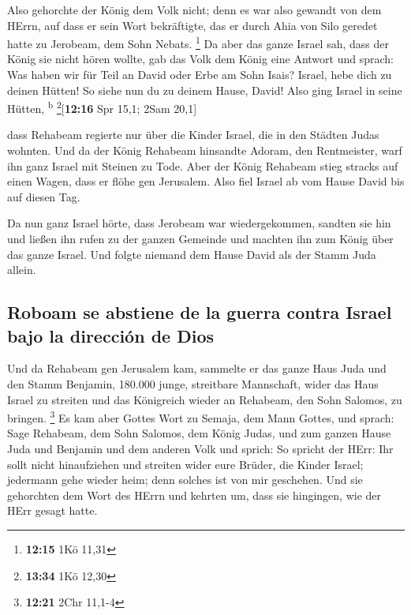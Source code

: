  Also gehorchte der König dem Volk nicht; denn es war
also gewandt von dem HErrn, auf dass er sein Wort bekräftigte, das er
durch Ahia von Silo geredet hatte zu Jerobeam, dem Sohn Nebats.
\footnote{\textbf{12:15} 1Kö 11,31}  Da aber das ganze
Israel sah, dass der König sie nicht hören wollte, gab das Volk dem
König eine Antwort und sprach: Was haben wir für Teil an David oder Erbe
am Sohn Isais? Israel, hebe dich zu deinen Hütten! So siehe nun du zu
deinem Hause, David! Also ging Israel in seine Hütten,
\textsuperscript{b} \footnote{\textbf{13:34} 1Kö 12,30}{[}\textbf{12:16}
Spr 15,1; 2Sam 20,1{]}

 dass Rehabeam regierte nur über die Kinder Israel, die
in den Städten Judas wohnten.  Und da der König Rehabeam
hinsandte Adoram, den Rentmeister, warf ihn ganz Israel mit Steinen zu
Tode. Aber der König Rehabeam stieg stracks auf einen Wagen, dass er
flöhe gen Jerusalem.  Also fiel Israel ab vom Hause David
bis auf diesen Tag.

 Da nun ganz Israel hörte, dass Jerobeam war
wiedergekommen, sandten sie hin und ließen ihn rufen zu der ganzen
Gemeinde und machten ihn zum König über das ganze Israel. Und folgte
niemand dem Hause David als der Stamm Juda allein.

\hypertarget{roboam-se-abstiene-de-la-guerra-contra-israel-bajo-la-direcciuxf3n-de-dios}{%
\subsection{Roboam se abstiene de la guerra contra Israel bajo la
dirección de
Dios}\label{roboam-se-abstiene-de-la-guerra-contra-israel-bajo-la-direcciuxf3n-de-dios}}

 Und da Rehabeam gen Jerusalem kam, sammelte er das ganze
Haus Juda und den Stamm Benjamin, 180.000 junge, streitbare Mannschaft,
wider das Haus Israel zu streiten und das Königreich wieder an Rehabeam,
den Sohn Salomos, zu bringen. \footnote{\textbf{12:21} 2Chr 11,1-4}
 Es kam aber Gottes Wort zu Semaja, dem Mann Gottes, und
sprach:  Sage Rehabeam, dem Sohn Salomos, dem König
Judas, und zum ganzen Hause Juda und Benjamin und dem anderen Volk und
sprich:  So spricht der HErr: Ihr sollt nicht
hinaufziehen und streiten wider eure Brüder, die Kinder Israel;
jedermann gehe wieder heim; denn solches ist von mir geschehen. Und sie
gehorchten dem Wort des HErrn und kehrten um, dass sie hingingen, wie
der HErr gesagt hatte.

